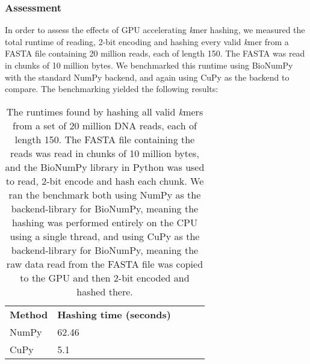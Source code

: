 \subsubsection{Assessment}
In order to assess the effects of GPU accelerating \textit{k}mer hashing, we measured the total runtime of reading, 2-bit encoding and hashing every valid \textit{k}mer from a FASTA file containing 20 million reads, each of length 150.
The FASTA was read in chunks of 10 million bytes.
We benchmarked this runtime using BioNumPy with the standard NumPy backend, and again using CuPy as the backend to compare.
The benchmarking yielded the following results:
\begin{table}[H]
\begin{center}
\begin{tabular}{lllll}
\multicolumn{1}{l|}{\textbf{Method}} & \multicolumn{1}{l}{\textbf{Hashing time (seconds)}} &  \\ \cline{1-2}
\multicolumn{1}{l|}{NumPy} & \multicolumn{1}{l}{62.46} &  \\
\multicolumn{1}{l|}{CuPy} & \multicolumn{1}{l}{5.1} &  \\
\end{tabular}
\end{center}
\caption{
  The runtimes found by hashing all valid \textit{k}mers from a set of 20 million DNA reads, each of length 150.
  The FASTA file containing the reads was read in chunks of 10 million bytes, and the BioNumPy library in Python was used to read, 2-bit encode and hash each chunk.
  We ran the benchmark both using NumPy as the backend-library for BioNumPy, meaning the hashing was performed entirely on the CPU using a single thread, and using CuPy as the backend-library for BioNumPy, meaning the raw data read from the FASTA file was copied to the GPU and then 2-bit encoded and hashed there.
}
\label{methods:gpu_accelerating_kmer_hashing:tables:benchmark}
\end{table}

